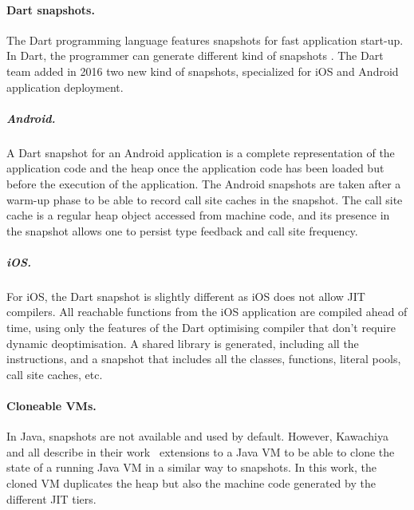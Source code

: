 \documentclass[a4paper,12pt,twoside]{../includes/ThesisStyle}
\begin{document}
\paragraph{Dart snapshots.}
The Dart programming language features snapshots for fast application start-up. In Dart, the programmer can generate different kind of snapshots \cite{Anna13a}. The Dart team added in 2016 two new kind of snapshots, specialized for iOS and Android application deployment.

\subparagraph{Android.} A Dart snapshot for an Android application is a complete representation of the application code and the heap once the application code has been loaded but before the execution of the application. The Android snapshots are taken after a warm-up phase to be able to record call site caches in the snapshot. The call site cache is a regular heap object accessed from machine code, and its presence in the snapshot allows one to persist type feedback and call site frequency.

\subparagraph{iOS.} For iOS, the Dart snapshot is slightly different as iOS does not allow JIT compilers. All reachable functions from the iOS application are compiled ahead of time, using only the features of the Dart optimising compiler that don't require dynamic deoptimisation. A shared library is generated, including all the instructions, and a snapshot that includes all the classes, functions, literal pools, call site caches, etc.

\paragraph{Cloneable VMs.}
In Java, snapshots are not available and used by default. However, Kawachiya and all describe in their work~\cite{Kawa07a} extensions to a Java VM to be able to clone the state of a running Java VM in a similar way to snapshots. In this work, the cloned VM duplicates the heap but also the machine code generated by the different JIT tiers.



\end{document}
